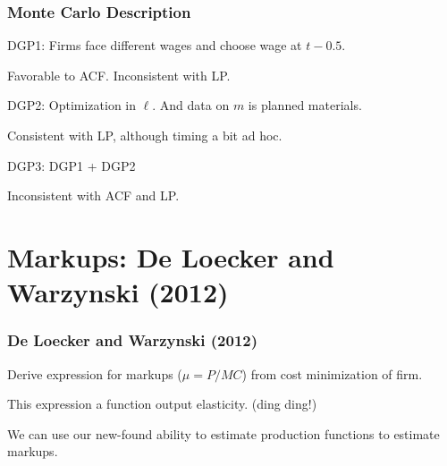 \documentclass[11pt, aspectratio=169]{beamer}
\newenvironment{wideitemize}{\itemize\addtolength{\itemsep}{10pt}}{\enditemize}
\begin{document}
\begin{frame}[c]\frametitle{Monte Carlo Description}
    

\begin{wideitemize}
	\item DGP1: Firms face different wages and choose wage at $t-0.5$.
	\begin{wideitemize}
		\item Favorable to ACF. Inconsistent with LP.
	\end{wideitemize}
	\item DGP2: Optimization in $\ell$. And data on $m$ is planned materials.
	\begin{wideitemize}
		\item Consistent with LP, although timing a bit ad hoc.
	\end{wideitemize}	
	\item DGP3: DGP1 + DGP2
	\begin{wideitemize}
		\item Inconsistent with ACF and LP.
	\end{wideitemize}	
\end{wideitemize}

\end{frame}




\section{Markups: De Loecker and Warzynski (2012)} %
\label{sec:de_loecker_and_warzynski_}

\begin{frame}[c]\frametitle{De Loecker and Warzynski (2012)}
    
\begin{wideitemize}
	\item Derive expression for markups ($\mu = P/MC$) from cost minimization of firm.
	\item This expression a function output elasticity. (ding ding!)
	\item We can use our new-found ability to estimate production functions to estimate markups. 
\end{wideitemize}

\end{frame}
\end{document}
